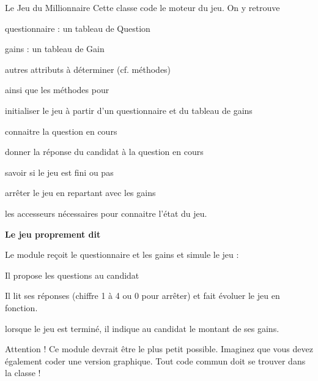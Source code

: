 \begin{Exercice}{Le Jeu du Millionnaire}
	Cette classe code le moteur du jeu. On y retrouve

	\begin{liste}
		\item 
			questionnaire : un tableau de Question
		\item 
			gains : un tableau de Gain
		\item 
			autres attributs à déterminer (cf. méthodes)
	\end{liste}
	
	ainsi que les méthodes pour

	\begin{liste}
		\item 
			initialiser le jeu à partir d’un questionnaire
			et du tableau de gains
		\item 
			connaitre la question en cours
		\item 
			donner la réponse du candidat à la question en
			cours
		\item 
			savoir si le jeu est fini ou pas
		\item 
			arrêter le jeu en repartant avec les gains
		\item 
			les accesseurs nécessaires pour connaitre
			l’état du jeu.
	\end{liste}
	
	{\bfseries
	Le jeu proprement dit}

	Le module  reçoit le
	questionnaire et les gains et simule le jeu :

	\begin{liste}
	\item 
		Il propose les questions au candidat
	\item 
		Il lit ses réponses (chiffre 1 à 4 ou 0 pour
		arrêter) et fait évoluer le jeu en fonction.
	\item 
		lorsque le jeu est terminé, il indique au
		candidat le montant de ses gains.
	\item 
		Attention ! Ce module devrait être le plus
		petit possible. Imaginez que vous devez également coder une version
		graphique. Tout code commun doit se trouver dans la classe
	!
	\end{liste}
\end{Exercice}

